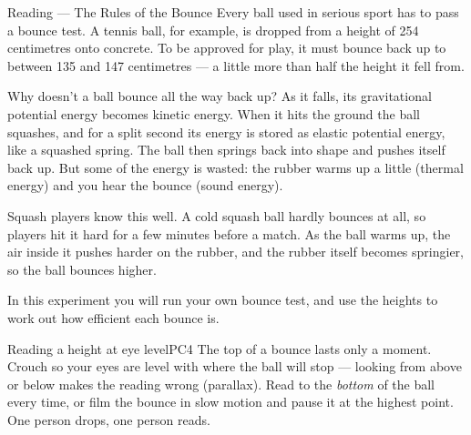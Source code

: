 
\begin{readingbox}{Reading --- The Rules of the Bounce}
Every ball used in serious sport has to pass a bounce test. A tennis ball, for example, is dropped from a height of 254 centimetres onto concrete. To be approved for play, it must bounce back up to between 135 and 147 centimetres --- a little more than half the height it fell from.

Why doesn't a ball bounce all the way back up? As it falls, its gravitational potential energy becomes kinetic energy. When it hits the ground the ball squashes, and for a split second its energy is stored as elastic potential energy, like a squashed spring. The ball then springs back into shape and pushes itself back up. But some of the energy is wasted: the rubber warms up a little (thermal energy) and you hear the bounce (sound energy).

Squash players know this well. A cold squash ball hardly bounces at all, so players hit it hard for a few minutes before a match. As the ball warms up, the air inside it pushes harder on the rubber, and the rubber itself becomes springier, so the ball bounces higher.

In this experiment you will run your own bounce test, and use the heights to work out how efficient each bounce is.
\end{readingbox}

\rcreset
{}


\begin{technique}{Reading a height at eye level}{PC4}
The top of a bounce lasts only a moment. Crouch so your eyes are level with where the ball will stop --- looking from above or below makes the reading wrong (parallax). Read to the \emph{bottom} of the ball every time, or film the bounce in slow motion and pause it at the highest point. One person drops, one person reads.
\end{technique}

